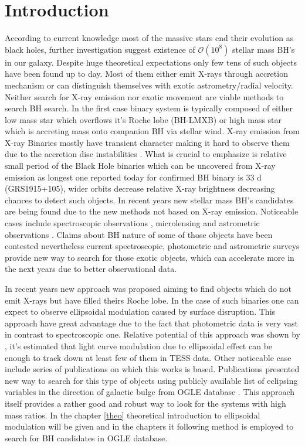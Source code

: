 \documentclass{pracalicmgr}
\begin{document}
\chapter{Introduction}
\hspace{1cm} According to current knowledge most of the massive stars end their evolution as black holes, further investigation suggest existence of $\mathcal{O}(10^8)$ 
stellar mass BH's \citep{brown_scenario_1994} in our galaxy. Despite huge theoretical expectations only few tens of such objects have been found up to day. Most of them either emit X-rays through
accretion mechanism or can distinguish themselves with exotic astrometry/radial velocity. Neither search for X-ray emission nor exotic movement are viable methods to search BH search.
In the first case binary system is typically composed of either low mass star which overflows it's Roche lobe
(BH-LMXB) or high mass star which is accreting mass onto companion BH via stellar wind. X-ray emission from X-ray Binaries mostly have transient character \citep{bambi_transient_2016}
making it hard to observe them due to the accretion disc instabilities \citep{lasota_disc_2001}. What is crucial to emphasize is relative small period of the Black Hole binaries 
which can be uncovered from X-ray emission as longest one reported today for confirmed BH binary is $33$ d (GRS1915+105), wider orbits decrease relative X-ray brightness decreasing
chances to detect such objects.
In recent years new stellar mass BH's candidates are being found due to the new methods not based on X-ray emission. Noticeable cases include spectroscopic observations 
\citep{liu_wide_2019,jayasinghe_unicorn_2021}, microlensing \citep{sahu_isolated_2022} and astrometric observations \citep{el-badry_sun-like_2022}. Claims about BH nature of 
some of those objects have been contested nevertheless current spectroscopic, photometric and astrometric surveys provide new way to search for those exotic objects, which can
accelerate more in the next years due to better observational data.

In recent years new approach was proposed aiming to find objects which do not emit X-rays but have filled theirs Roche lobe. In the case of such binaries one can expect to
observe ellipsoidal modulation caused by surface disruption. This approach have great advantage due to the fact that photometric data is very vast in contrast to spectroscopic one.
Relative potential of this approach was shown by \citep{masuda_prospects_2019}, it's estimated that light curve modulation due to ellipsoidal effect can be enough to track down
at least few of them in TESS data. Other noticeable case include series of publications \citep{gomel_search_2021,gomel_search_2021-1,gomel_search_2021-2} on which this works is based.
Publications presented new way to search for this type of objects using publicly available list of eclipsing variables in the direction of galactic bulge from OGLE database
 \citep{soszynski_ogle_2016}. This approach itself provides a rather good and robust way to look for the systems with high mass ratios. In the chapter \ref{theo} theoretical
introduction to ellipsoidal modulation will be given and in the chapters it following method is employed to search for BH candidates in OGLE database.
\end{document}
